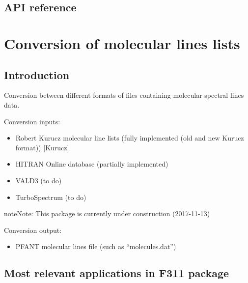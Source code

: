 \documentclass[letterpaper,10pt,english]{sphinxmanual}
\begin{document}
\section{API reference}
\label{\detokenize{pyfant:api-reference}}


\chapter{Conversion of molecular lines lists}
\label{\detokenize{convmol:conversion-of-molecular-lines-lists}}\label{\detokenize{convmol::doc}}

\section{Introduction}
\label{\detokenize{convmol:introduction}}
Conversion between different formats of files containing molecular spectral lines data.

Conversion inputs:
\begin{itemize}
\item {} 
Robert Kurucz molecular line lists (fully implemented (old and new Kurucz format)) {[}Kurucz{]}

\item {} 
HITRAN Online database (partially implemented)

\item {} 
VALD3 (to do)

\item {} 
TurboSpectrum (to do)

\end{itemize}

\begin{sphinxadmonition}{note}{Note:}
This package is currently under construction (2017-11-13)
\end{sphinxadmonition}

Conversion output:
\begin{itemize}
\item {} 
PFANT molecular lines file (such as “molecules.dat”)

\end{itemize}


\section{Most relevant applications in F311 package}
\label{\detokenize{convmol:most-relevant-applications-in-f311-package}}
\end{document}
